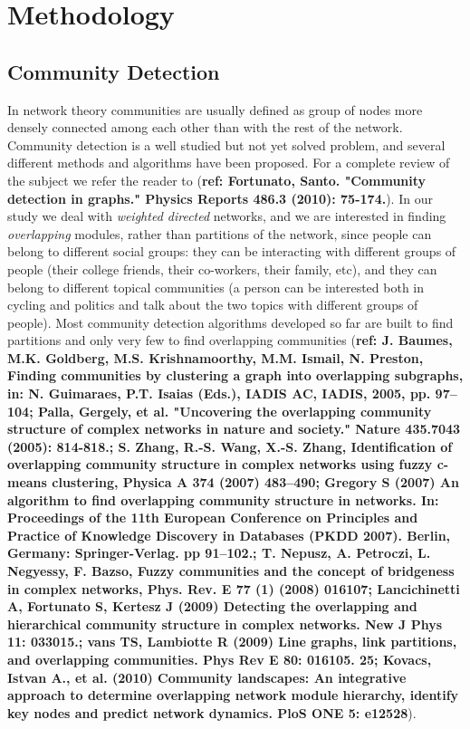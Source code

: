 \section{Methodology}

\subsection{Community Detection}

In network theory communities are usually defined as group of nodes more densely connected among each other than with the rest of the network. Community detection is a well studied but not yet solved problem, and several different methods and algorithms have been proposed. For a complete review of the subject we refer the reader to (\textbf{ref: Fortunato, Santo. "Community detection in graphs." Physics Reports 486.3 (2010): 75-174.}). In our study we deal with \textit{weighted directed} networks, and we are interested in finding \textit{overlapping} modules, rather than partitions of the network, since people can belong to different social groups: they can be interacting with different groups of people (their college friends, their co-workers, their family, etc), and they can belong to different topical communities (a person can be interested both in cycling and politics and talk about the two topics with different groups of people). Most community detection algorithms developed so far are built to find partitions and only very few to find overlapping communities (\textbf{ref: J. Baumes, M.K. Goldberg, M.S. Krishnamoorthy, M.M. Ismail, N. Preston, Finding communities by clustering a graph into overlapping subgraphs, in: N. Guimaraes, P.T. Isaias (Eds.), IADIS AC, IADIS, 2005, pp. 97–104; Palla, Gergely, et al.
 "Uncovering the overlapping community structure of complex networks in nature and society." Nature 435.7043 (2005): 814-818.; S. Zhang, R.-S. Wang, X.-S. Zhang, Identification of overlapping community structure in complex networks using fuzzy c-means clustering, Physica A 374 (2007) 483–490; Gregory S (2007) An algorithm to find overlapping community structure in networks. In: Proceedings of the 11th European Conference on Principles and Practice of Knowledge Discovery in Databases (PKDD 2007).
Berlin, Germany: Springer-Verlag. pp 91–102.; T. Nepusz, A. Petroczi, L. Negyessy, F. Bazso, Fuzzy communities and the concept of bridgeness in complex networks, Phys. Rev. E 77 (1) (2008) 016107; 
Lancichinetti A, Fortunato S, Kertesz J (2009) Detecting the overlapping and hierarchical community structure in complex networks. New J Phys 11: 033015.; 
vans TS, Lambiotte R (2009) Line graphs, link partitions, and overlapping communities. Phys Rev E 80: 016105. 25; Kovacs, Istvan A., et al. (2010) 
Community landscapes: An integrative approach to determine overlapping network module hierarchy, identify key nodes and predict network dynamics. PloS ONE 5: e12528}). 

